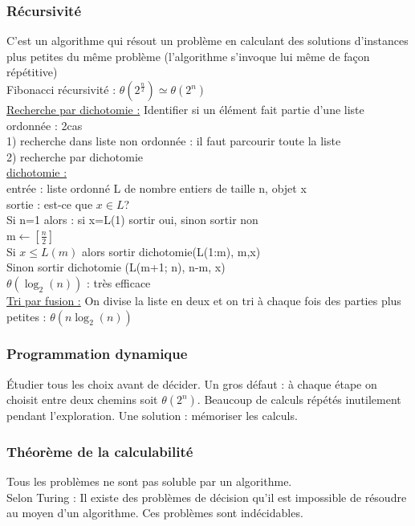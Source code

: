 \documentclass[../main.tex]{subfiles}
\begin{document}
\subsubsection{Récursivité}
C'est un algorithme qui résout un problème en calculant des solutions d'instances plus petites du même problème (l'algorithme s'invoque lui même de façon répétitive)\\

Fibonacci récursivité : $\theta(2^{\frac{n}{2}}) \simeq \theta(2^n)$\\

 \quad \underline{Recherche par dichotomie :} Identifier si un élément fait partie d'une liste ordonnée : 2cas\\
 1) recherche dans liste non ordonnée : il faut parcourir toute la liste\\
 2) recherche par dichotomie\\
 \underline{dichotomie :}\\
 entrée : liste ordonné L de nombre entiers de taille n, objet x\\
 sortie : est-ce que $x\in L$?\\
 Si n=1 alors : si x=L(1) sortir oui, sinon sortir non\\
 m$\leftarrow [\frac{n}{2}]$\\
 Si $x\leq L(m)$ alors sortir dichotomie(L(1:m), m,x)\\
 Sinon sortir dichotomie (L(m+1; n), n-m, x)\\
$\theta(\log_2(n))$ : très efficace\\


\quad \underline{Tri par fusion :}
On divise la liste en deux et on tri à chaque fois des parties plus petites : $\theta(n\log_2(n))$\\

\subsubsection{Programmation dynamique}
Étudier tous les choix avant de décider. Un gros défaut : à chaque étape on choisit entre deux chemins soit $\theta(2^n)$. Beaucoup de calculs répétés inutilement pendant l'exploration. Une solution : mémoriser les calculs.\\

\subsubsection{Théorème de la calculabilité}
Tous les problèmes ne sont pas soluble par un algorithme. \\
Selon Turing : Il existe des problèmes de décision qu'il est impossible de résoudre au moyen d'un algorithme. Ces problèmes sont indécidables.\\
\end{document}
